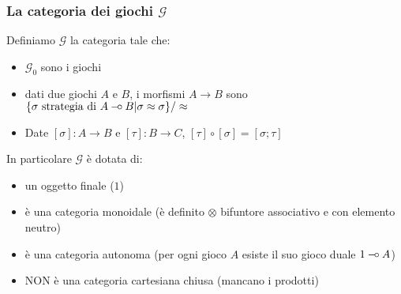 \documentclass{beamer}
\newcommand{\limp}{\mathbin{{-}\mkern-3.5mu{\circ}}}
\begin{document}
% 	
% 	
% 
% 	
% 	

\begin{frame}
	
	\frametitle{La categoria dei giochi $\mathcal{G}$}
	
	Definiamo $\mathcal{G}$ la categoria tale che:
	\begin{itemize}
		\item $\mathcal{G}_0$ sono i giochi
		\item dati due giochi $A$ e $B$, i morfismi $A\rightarrow B$ sono $\{ \sigma \text{ strategia di } A\limp B | \sigma \approx \sigma \} / \approx$
		\item Date $[\sigma] : A\rightarrow B$ e $[\tau] : B \rightarrow C$, $[\tau] \circ [\sigma] = [\sigma ; \tau]$
	\end{itemize}
	
	In particolare $\mathcal{G}$ è dotata di:
	\begin{itemize}
		\item un oggetto finale ($1$)
		\item è una categoria monoidale (è definito $\otimes$ bifuntore associativo e con elemento neutro)
		\item è una categoria autonoma (per ogni gioco $A$ esiste il suo gioco duale $1 \limp A$)
		\item NON è una categoria cartesiana chiusa (mancano i prodotti)
	\end{itemize}
	
\end{frame}
\end{document}
